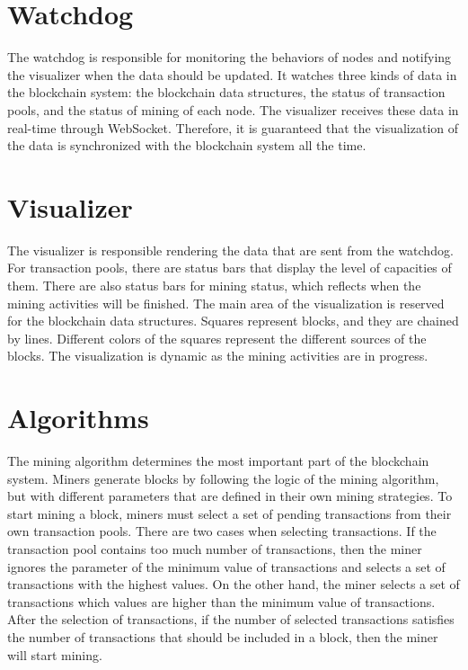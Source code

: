 \section{Watchdog}

The watchdog is responsible for monitoring the behaviors of nodes and notifying the visualizer when the data should be updated. It watches three kinds of data in the blockchain system: the blockchain data structures, the status of transaction pools, and the status of mining of each node. The visualizer receives these data in real-time through WebSocket. Therefore, it is guaranteed that the visualization of the data is synchronized with the blockchain system all the time.

\section{Visualizer}

The visualizer is responsible rendering the data that are sent from the watchdog. For transaction pools, there are status bars that display the level of capacities of them. There are also status bars for mining status, which reflects when the mining activities will be finished. The main area of the visualization is reserved for the blockchain data structures. Squares represent blocks, and they are chained by lines. Different colors of the squares represent the different sources of the blocks. The visualization is dynamic as the mining activities are in progress.

\section{Algorithms}

The mining algorithm determines the most important part of the blockchain system. Miners generate blocks by following the logic of the mining algorithm, but with different parameters that are defined in their own mining strategies. To start mining a block, miners must select a set of pending transactions from their own transaction pools. There are two cases when selecting transactions. If the transaction pool contains too much number of transactions, then the miner ignores the parameter of the minimum value of transactions and selects a set of transactions with the highest values. On the other hand, the miner selects a set of transactions which values are higher than the minimum value of transactions. After the selection of transactions, if the number of selected transactions satisfies the number of transactions that should be included in a block, then the miner will start mining.

